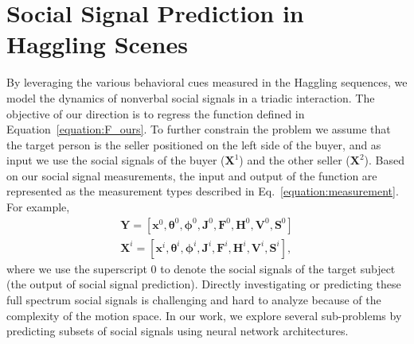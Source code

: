 
\section{Social Signal Prediction in Haggling Scenes}
By leveraging the various behavioral cues measured in the Haggling sequences, we model the dynamics of nonverbal social signals in a triadic interaction. The objective of our direction is to regress the function defined in Equation~\ref{equation:F_ours}. To further constrain the problem we assume that the target person is the seller positioned on the left side of the buyer, and as input we use the social signals of the buyer ($\mathbf{X}^1$) and the other seller ($\mathbf{X}^2$). Based on our social signal measurements, the input and output of the function are represented as the measurement types described in Eq.~\ref{equation:measurement}. For example,
\begin{equation}
\begin{gathered}
\mathbf{Y} = [ \mathbf{x}^0, \boldsymbol{\theta}^0, \boldsymbol{\phi}^0, \mathbf{J}^0, \mathbf{F}^0, \mathbf{H}^0, \mathbf{V}^0, \mathbf{S}^0 ]\\
\mathbf{X}^i = [ \mathbf{x}^i, \boldsymbol{\theta}^i, \boldsymbol{\phi}^i, \mathbf{J}^i, \mathbf{F}^i, \mathbf{H}^i, \mathbf{V}^i, \mathbf{S}^i ],
\end{gathered}
\end{equation}
where we use the superscript 0 to denote the social signals of the target subject (the output of social signal prediction). Directly investigating or predicting these full spectrum social signals is challenging and hard to analyze because of the complexity of the motion space. In our work, we explore several sub-problems by predicting subsets of social signals using neural network architectures.  


